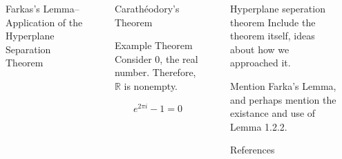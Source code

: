 \documentclass[final]{beamer}
\newlength{\sepwidth}
\newlength{\colwidth}
\newcommand{\separatorcolumn}{\begin{column}{\sepwidth}\end{column}}
\begin{document}
\begin{frame}[fragile]
\begin{columns}[t]
\begin{column}{\colwidth}
\begin{alertblock}{Farkas's Lemma--Application of the Hyperplane Separation Theorem}
            \end{alertblock}
           

        \end{column}

        \separatorcolumn

        \begin{column}{\colwidth}

            \begin{block*}


            \end{block*}

            \begin{block}{Carath\'eodory's Theorem}

                \begin{alertblock}{Example Theorem}
                    Consider 0, the real number. Therefore, $\mathbb{R}$ is nonempty. 
                \end{alertblock}

                \begin{equation}
                    e^{2\pi i} - 1 = 0
                \end{equation}
            \end{block}

            
        \end{column}

        \separatorcolumn

        \begin{column}{\colwidth}

            \begin{block}{Hyperplane seperation theorem}
                Include the theorem itself, ideas about how we approached it.

                Mention Farka's Lemma, and perhaps mention the existance and use of Lemma 1.2.2. 
            \end{block}
            

            \begin{block}{References}
            
            
            

            \end{block}

        \end{column}

        \separatorcolumn
        \end{columns}
\end{frame}
\end{document}
